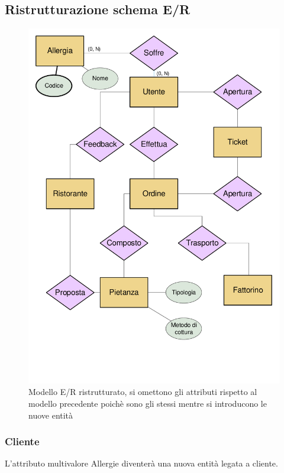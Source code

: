 \documentclass[10pt]{article}
\begin{document}
		\subsection{Ristrutturazione schema E/R}
			\begin{figure}[H]
			\begin{center}
				\hspace*{-1cm}
				\includegraphics[scale=0.54]{er_ristrutturato.pdf}
				\hspace*{-1cm}
			\end{center}
                        \caption{Modello E/R ristrutturato, si omettono gli attributi rispetto al modello precedente poichè sono gli stessi mentre si introducono le nuove entità }
		\end{figure}
			\subsubsection{Cliente} 
			L'attributo multivalore Allergie\footnotemark{} diventerà una nuova entità legata a cliente.
\end{document}
